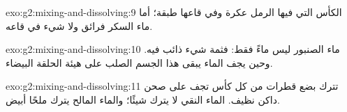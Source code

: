 \begin{solution}{exo:g2:mixing-and-dissolving:9}
الكأس التي فيها الرمل عكرة وفي قاعها طبقة؛ أما ماء السكر فرائق ولا
شيء في قاعه.
\end{solution}

\begin{solution}{exo:g2:mixing-and-dissolving:10}
ماء الصنبور ليس ماءً فقط: فثمة شيء ذائب فيه. وحين يجف الماء يبقى هذا
الجسم الصلب على هيئة الحلقة البيضاء.
\end{solution}

\begin{solution}{exo:g2:mixing-and-dissolving:11}
تترك بضع قطرات من كل كأس تجف على صحن داكن نظيف. الماء النقي لا يترك
شيئًا؛ والماء المالح يترك ملحًا أبيض.
\end{solution}
